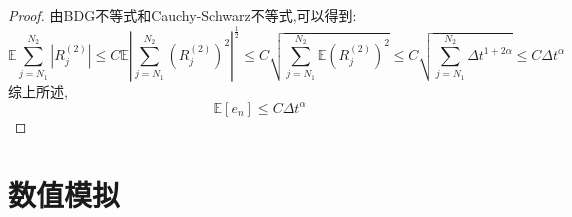 \begin{proof}
	由BDG不等式和Cauchy-Schwarz不等式,可以得到:
	\begin{equation*}
		\mathbb{E}\sum_{j=N_1}^{N_2}\left|R_{j}^{(2)}\right|  \le C\mathbb{E} \left|\sum_{j=N_1}^{N_2}(R_{j}^{(2)})^2\right|^{\frac{1}{2}} \le C\sqrt{\sum_{j=N_1}^{N_2}\mathbb{E}(R_{j}^{(2)})^2}
		\le C\sqrt{\sum_{j=N_1}^{N_2}\Delta t^{1+2\alpha}} \le C\Delta t^{\alpha}
	\end{equation*}
	综上所述,
	\begin{equation*}
		\mathbb{E} [e_n] \leq C\Delta t^\alpha
	\end{equation*}
\end{proof}

\section{数值模拟}

